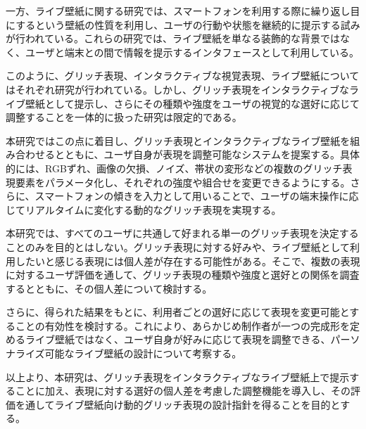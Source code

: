 一方、ライブ壁紙に関する研究では、スマートフォンを利用する際に繰り返し目にするという壁紙の性質を利用し、ユーザの行動や状態を継続的に提示する試みが行われている。これらの研究では、ライブ壁紙を単なる装飾的な背景ではなく、ユーザと端末との間で情報を提示するインタフェースとして利用している。

このように、グリッチ表現、インタラクティブな視覚表現、ライブ壁紙についてはそれぞれ研究が行われている。しかし、グリッチ表現をインタラクティブなライブ壁紙として提示し、さらにその種類や強度をユーザの視覚的な選好に応じて調整することを一体的に扱った研究は限定的である。

本研究ではこの点に着目し、グリッチ表現とインタラクティブなライブ壁紙を組み合わせるとともに、ユーザ自身が表現を調整可能なシステムを提案する。具体的には、RGBずれ、画像の欠損、ノイズ、帯状の変形などの複数のグリッチ表現要素をパラメータ化し、それぞれの強度や組合せを変更できるようにする。さらに、スマートフォンの傾きを入力として用いることで、ユーザの端末操作に応じてリアルタイムに変化する動的なグリッチ表現を実現する。

本研究では、すべてのユーザに共通して好まれる単一のグリッチ表現を決定することのみを目的とはしない。グリッチ表現に対する好みや、ライブ壁紙として利用したいと感じる表現には個人差が存在する可能性がある。そこで、複数の表現に対するユーザ評価を通して、グリッチ表現の種類や強度と選好との関係を調査するとともに、その個人差について検討する。

さらに、得られた結果をもとに、利用者ごとの選好に応じて表現を変更可能とすることの有効性を検討する。これにより、あらかじめ制作者が一つの完成形を定めるライブ壁紙ではなく、ユーザ自身が好みに応じて表現を調整できる、パーソナライズ可能なライブ壁紙の設計について考察する。

以上より、本研究は、グリッチ表現をインタラクティブなライブ壁紙上で提示することに加え、表現に対する選好の個人差を考慮した調整機能を導入し、その評価を通してライブ壁紙向け動的グリッチ表現の設計指針を得ることを目的とする。
